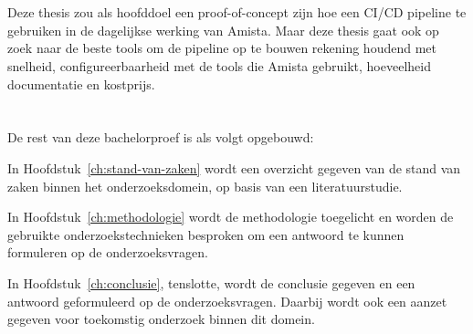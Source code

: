 \section{}
\label{sec:onderzoeksdoelstelling}

Deze thesis zou als hoofddoel een proof-of-concept zijn hoe een CI/CD pipeline te gebruiken in de dagelijkse werking van Amista. 
Maar deze thesis gaat ook op zoek naar de beste tools om de pipeline op te bouwen rekening houdend met snelheid, configureerbaarheid met de tools die Amista gebruikt, hoeveelheid documentatie en kostprijs.

\section{}
\label{sec:opzet-bachelorproef}


De rest van deze bachelorproef is als volgt opgebouwd:

In Hoofdstuk~\ref{ch:stand-van-zaken} wordt een overzicht gegeven van de stand van zaken binnen het onderzoeksdomein, op basis van een literatuurstudie.

In Hoofdstuk~\ref{ch:methodologie} wordt de methodologie toegelicht en worden de gebruikte onderzoekstechnieken besproken om een antwoord te kunnen formuleren op de onderzoeksvragen.



In Hoofdstuk~\ref{ch:conclusie}, tenslotte, wordt de conclusie gegeven en een antwoord geformuleerd op de onderzoeksvragen. Daarbij wordt ook een aanzet gegeven voor toekomstig onderzoek binnen dit domein.